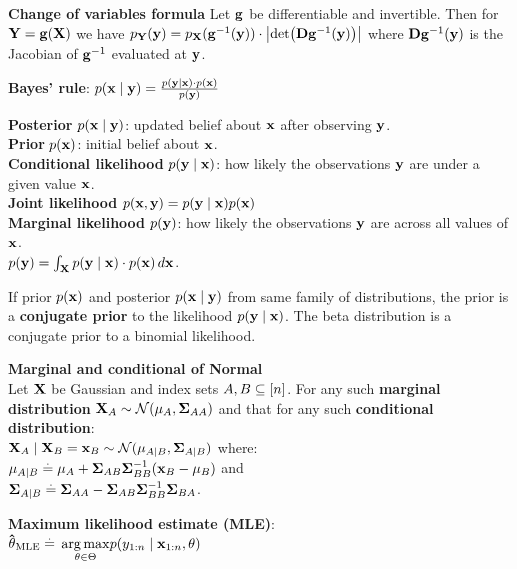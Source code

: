 \textbf{Change of variables formula}
Let $\mathbf{g}$ be differentiable and invertible. Then for $\mathbf{Y} = \mathbf{g}(\mathbf{X})$ we have $p_\rY(\vy) = p_\rX(\inv{\vg}(\vy)) \cdot \abs{\det{\jac \inv{\vg}(\vy)}}$ where $\mathbf{D} \mathbf{g}^{-1}(\mathbf{y})$ is the Jacobian of $\mathbf{g}^{-1}$ evaluated at $\mathbf{y}$.
\begin{framed}
\textbf{Bayes' rule}: 
$p(\mathbf{x} \mid \mathbf{y}) = \frac{p(\mathbf{y} \mid \mathbf{x}) \cdot p(\mathbf{x})}{p(\mathbf{y})}$
\end{framed}
\begin{framed}
    \textbf{Posterior} $p(\mathbf{x} \mid \mathbf{y})$: updated belief about $\mathbf{x}$ after observing $\mathbf{y}$. \\
    \textbf{Prior} $p(\mathbf{x})$: initial belief about $\mathbf{x}$. \\
    \textbf{Conditional likelihood} $p(\mathbf{y} \mid \mathbf{x})$: how likely the observations $\mathbf{y}$ are under a given value $\mathbf{x}$. \\
    \textbf{Joint likelihood} $p(\mathbf{x}, \mathbf{y}) = p(\mathbf{y} \mid \mathbf{x}) p(\mathbf{x})$ \\
    \textbf{Marginal likelihood} $p(\mathbf{y})$: how likely the observations $\mathbf{y}$ are across all values of $\mathbf{x}$. \\
    $p(\mathbf{y}) = \int_{\mathbf{X}} p(\mathbf{y} \mid \mathbf{x}) \cdot p(\mathbf{x}) \,d\mathbf{x}$. 
\end{framed}
If prior $p(\mathbf{x})$ and posterior $p(\mathbf{x} \mid \mathbf{y})$ from same family of distributions, the prior is a \textbf{conjugate prior} to the likelihood $p(\mathbf{y} \mid \mathbf{x})$. The beta distribution is a conjugate prior to a binomial likelihood. \\
\begin{framed}
    \textbf{Marginal and conditional of Normal} \\
    Let $\mathbf{X}$ be Gaussian and index sets $A, B \subseteq [n]$.
    For any such \textbf{marginal distribution} $\rX_A \sim \N{\vmu_\sA}{\mSigma_{\sA\sA}}$ and that for any such \textbf{conditional distribution}: \\
    $ \rX_\sA \mid \rX_\sB = \vx_\sB \sim \N{\vmu_{\sA \mid \sB}}{\mSigma_{\sA \mid \sB}}$ where: \\
        $\mathbf{\mu}_{A \mid B} \overset{.}{=} \mathbf{\mu}_A + \mathbf{\Sigma}_{AB}\mathbf{\Sigma}_{BB}^{-1}(\mathbf{x}_B - \mathbf{\mu}_B)$ and \\
        $\mathbf{\Sigma}_{A \mid B} \overset{.}{=} \mathbf{\Sigma}_{AA} - \mathbf{\Sigma}_{AB}\mathbf{\Sigma}_{BB}^{-1}\mathbf{\Sigma}_{BA}$.
\end{framed}
\textbf{Maximum likelihood estimate (MLE)}: \\
$\mathbf{\hat{\theta}}_{\mathrm{MLE}} \overset{.}{=}$
 $\underset{\mathbf{\theta} \in \Theta}{\operatorname*{arg\,max}} p(y_{1:n} \mid \mathbf{x}_{1:n}, \mathbf{\theta})$ \\
